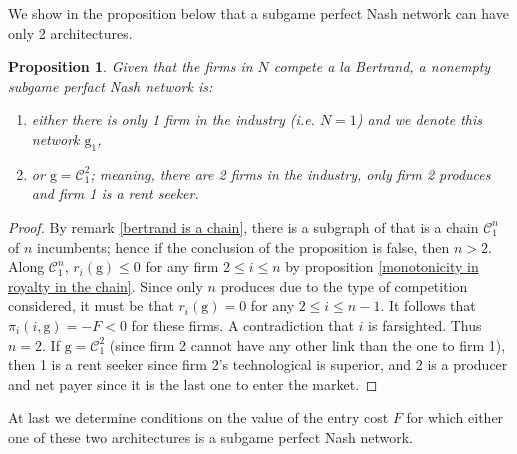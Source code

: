 \documentclass{article}
\newtheorem{proposition}{Proposition}
\begin{document}
We show in the proposition below that a subgame perfect Nash network can have only 2 architectures. \\

\begin{proposition}
Given that the firms in $N$ compete a la Bertrand, a nonempty subgame perfact Nash network is: 
\begin{enumerate}
\item either there is only 1 firm in the industry (i.e. $N=1$) and we denote this network $\text{g}_1$,
\item or $\text{g}=\mathcal{C}_1^2$; meaning, there are 2 firms in the industry, only firm 2 produces and firm 1 is a rent seeker.  
\end{enumerate}
\end{proposition}
\begin{proof}
By remark \ref{bertrand is a chain}, there is a subgraph of  that is a chain $\mathcal{C}_1^n$ of $n$ incumbents; hence if the conclusion of the proposition is false, then $n>2$. Along $\mathcal{C}_1^n$, $r_i(\text{g})\leq 0$ for any firm $2\leq i\leq n$ by proposition \ref{monotonicity in royalty in the chain}. Since only $n$ produces due to the type of competition considered, it must be that $r_i(\text{g})=0$ for any $2\leq i\leq n-1$. It follows that $\pi_i(i,\text{g})=-F<0$ for these firms. A contradiction that $i$ is farsighted. Thus $n=2$. If $\text{g}=\mathcal{C}_1^2$ (since firm 2 cannot have any other link than the one to firm 1), then 1 is a rent seeker since firm 2's technological is superior, and 2 is a producer and net payer since it is the last one to enter the market. 
\end{proof}

At last we determine conditions on the value of the entry cost $F$ for which either one of these two architectures is a subgame perfect Nash network. \\
\end{document}
